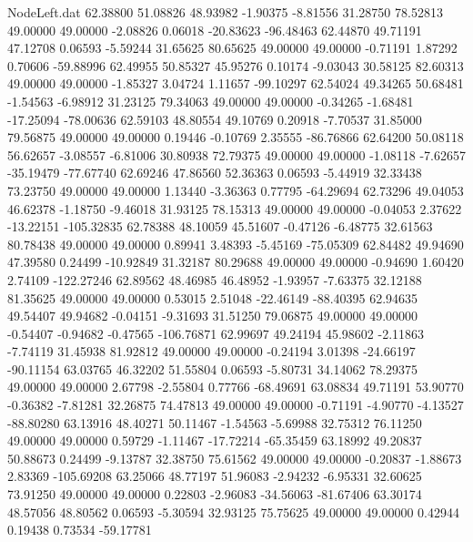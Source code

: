 \begin{filecontents}{NodeLeft.dat}
  62.38800   51.08826   48.93982    -1.90375   -8.81556   31.28750   78.52813   49.00000   49.00000   -2.08826    0.06018  -20.83623  -96.48463
  62.44870   49.71191   47.12708     0.06593   -5.59244   31.65625   80.65625   49.00000   49.00000   -0.71191    1.87292    0.70606  -59.88996
  62.49955   50.85327   45.95276     0.10174   -9.03043   30.58125   82.60313   49.00000   49.00000   -1.85327    3.04724    1.11657  -99.10297
  62.54024   49.34265   50.68481    -1.54563   -6.98912   31.23125   79.34063   49.00000   49.00000   -0.34265   -1.68481  -17.25094  -78.00636
  62.59103   48.80554   49.10769     0.20918   -7.70537   31.85000   79.56875   49.00000   49.00000    0.19446   -0.10769    2.35555  -86.76866
  62.64200   50.08118   56.62657    -3.08557   -6.81006   30.80938   72.79375   49.00000   49.00000   -1.08118   -7.62657  -35.19479  -77.67740
  62.69246   47.86560   52.36363     0.06593   -5.44919   32.33438   73.23750   49.00000   49.00000    1.13440   -3.36363    0.77795  -64.29694
  62.73296   49.04053   46.62378    -1.18750   -9.46018   31.93125   78.15313   49.00000   49.00000   -0.04053    2.37622  -13.22151 -105.32835
  62.78388   48.10059   45.51607    -0.47126   -6.48775   32.61563   80.78438   49.00000   49.00000    0.89941    3.48393   -5.45169  -75.05309
  62.84482   49.94690   47.39580     0.24499  -10.92849   31.32187   80.29688   49.00000   49.00000   -0.94690    1.60420    2.74109 -122.27246
  62.89562   48.46985   46.48952    -1.93957   -7.63375   32.12188   81.35625   49.00000   49.00000    0.53015    2.51048  -22.46149  -88.40395
  62.94635   49.54407   49.94682    -0.04151   -9.31693   31.51250   79.06875   49.00000   49.00000   -0.54407   -0.94682   -0.47565 -106.76871
  62.99697   49.24194   45.98602    -2.11863   -7.74119   31.45938   81.92812   49.00000   49.00000   -0.24194    3.01398  -24.66197  -90.11154
  63.03765   46.32202   51.55804     0.06593   -5.80731   34.14062   78.29375   49.00000   49.00000    2.67798   -2.55804    0.77766  -68.49691
  63.08834   49.71191   53.90770    -0.36382   -7.81281   32.26875   74.47813   49.00000   49.00000   -0.71191   -4.90770   -4.13527  -88.80280
  63.13916   48.40271   50.11467    -1.54563   -5.69988   32.75312   76.11250   49.00000   49.00000    0.59729   -1.11467  -17.72214  -65.35459
  63.18992   49.20837   50.88673     0.24499   -9.13787   32.38750   75.61562   49.00000   49.00000   -0.20837   -1.88673    2.83369 -105.69208
  63.25066   48.77197   51.96083    -2.94232   -6.95331   32.60625   73.91250   49.00000   49.00000    0.22803   -2.96083  -34.56063  -81.67406
  63.30174   48.57056   48.80562     0.06593   -5.30594   32.93125   75.75625   49.00000   49.00000    0.42944    0.19438    0.73534  -59.17781

\end{filecontents}
